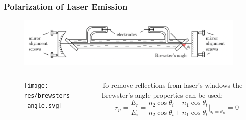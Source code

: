 \documentclass{beamer}
\begin{document}
	
		\begin{frame}
			\frametitle{Polarization of Laser Emission}
			\begin{figure}
				\centering
				\includegraphics[width=1\linewidth]{res/brewster_setup.pdf}
			\end{figure}
			
			\begin{columns}
				\begin{column}{0.3\textwidth}
					\begin{figure}
						\centering
						\texttt{[image: res/brewsters-angle.svg]}
					\end{figure}
				\end{column}
				\begin{column}{0.7\textwidth}
					To remove reflections from laser's windows the Brewster's angle properties can be used:
					$$r_p = \frac{E_r}{E_i} = \frac{n_2 \cos{\theta_i} - n_1 \cos{\theta_t}}{n_2 \cos{\theta_i} + n_1 \cos{\theta_t}}\bigg\rvert_{\theta_i = \theta_B} = 0$$
				\end{column}
			\end{columns}	
	\end{frame}
	
\end{document}
